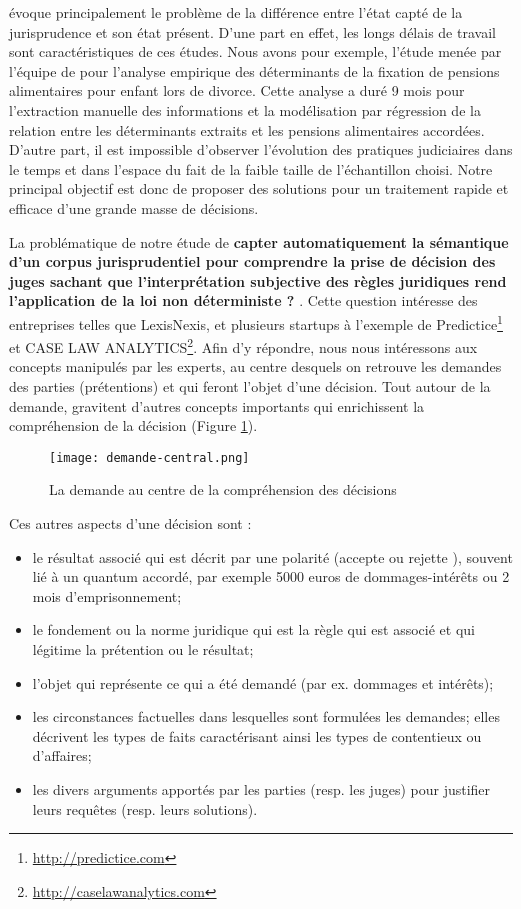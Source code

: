 \citet{ancel2003expulsion} évoque principalement le problème de la différence entre l'état capté de la jurisprudence et son état présent. D'une part en effet, les longs délais de travail sont caractéristiques de ces études. Nous avons pour exemple, l'étude menée  par l'équipe de \citet{jeandidier2006pensions} pour l'analyse empirique des déterminants de la fixation de pensions alimentaires pour enfant lors de divorce. Cette analyse a duré 9 mois pour l'extraction manuelle des informations et la modélisation par régression de la relation entre les déterminants extraits et les pensions alimentaires accordées.  D'autre part, il est impossible d'observer l'évolution des pratiques judiciaires dans le temps et dans l'espace du fait de la faible taille de l'échantillon choisi. Notre principal objectif est donc de proposer des solutions pour un traitement rapide et efficace d'une grande masse de décisions. 
 
 La problématique de notre étude de \og \textbf{capter automatiquement la sémantique d'un corpus jurisprudentiel pour comprendre la prise de décision des juges sachant que l'interprétation subjective des règles juridiques rend l'application de la loi non déterministe ?} \fg{}. Cette question intéresse des entreprises telles que LexisNexis, et plusieurs startups  à l'exemple de Predictice\footnote{\url{http://predictice.com}} et CASE LAW ANALYTICS\footnote{\url{http://caselawanalytics.com}}. Afin d'y répondre, nous nous intéressons  aux concepts manipulés par les experts, au centre desquels on retrouve les demandes des parties (prétentions) et qui feront l'objet d'une décision. Tout autour de la demande, gravitent d'autres concepts importants qui enrichissent la compréhension de la décision (Figure \ref{fig:intro:demande-central}).
 \begin{figure}[!htb]
 	\centering
 	\texttt{[image: demande-central.png]}
 	\caption{La demande au centre de la compréhension des décisions}
 	\label{fig:intro:demande-central}
 \end{figure} 

Ces autres aspects d'une décision sont :
 \begin{itemize}
	\item le résultat associé qui est décrit par une polarité (\og accepte \fg{} ou \og rejette \fg{}), souvent lié à un quantum accordé, par exemple 5000 euros de dommages-intérêts ou 2 mois d'emprisonnement;
	\item le fondement ou la norme juridique qui est la règle qui est associé et qui légitime la prétention ou le résultat;	
	\item l'objet qui représente ce qui a été demandé (par ex. dommages et intérêts);
	\item les circonstances factuelles 	dans lesquelles sont formulées les demandes; elles décrivent les types de faits caractérisant ainsi les types de contentieux ou d'affaires;
	\item les divers arguments apportés par les parties (resp. les juges) pour justifier leurs requêtes (resp. leurs solutions).
 \end{itemize}

